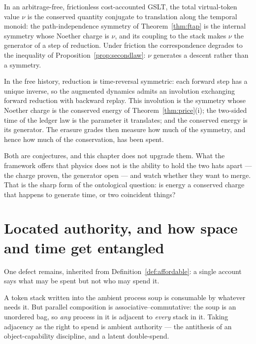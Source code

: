 \begin{conjecture}
\label{conj:conjugacy}
In an arbitrage-free, frictionless cost-accounted GSLT, the total
virtual-token value $\nu$ is the conserved quantity conjugate to
translation along the temporal monoid: the path-independence symmetry of
Theorem~\ref{thm:ftap} is the internal symmetry whose Noether charge is
$\nu$, and its coupling to the stack makes $\nu$ the generator of a step
of reduction.  Under friction the correspondence degrades to the
inequality of Proposition~\ref{prop:secondlaw}: $\nu$ generates a descent
rather than a symmetry.
\end{conjecture}

\begin{conjecture}
\label{conj:reversal}
In the free history, reduction is time-reversal symmetric: each forward
step has a unique inverse, so the augmented dynamics admits an involution
exchanging forward reduction with backward replay.  This involution is the
symmetry whose Noether charge is the conserved energy of
Theorem~\ref{thm:price}(i); the two-sided time of the ledger law is the
parameter it translates; and the conserved energy is its generator.  The
erasure grades then measure how much of the symmetry, and hence how much
of the conservation, has been spent.
\end{conjecture}

Both are conjectures, and this chapter does not upgrade them.  What the
framework offers that physics does not is the ability to hold the two
hats apart --- the charge proven, the generator open --- and watch whether
they want to merge.  That is the sharp form of the ontological question:
is energy a conserved charge that happens to generate time, or two
coincident things?

\section{Located authority, and how space and time get entangled}

One defect remains, inherited from Definition~\ref{def:affordable}: a
single account says what may be spent but not who may spend it.

\begin{remark}
\label{rmk:ambient}
A token stack written into the ambient process soup is consumable by
whatever needs it.  But parallel composition is
associative--commutative: the soup is an unordered bag, so \emph{any}
process in it is adjacent to \emph{every} stack in it.  Taking adjacency
as the right to spend is ambient authority --- the antithesis of an
object-capability discipline, and a latent double-spend.
\end{remark}

